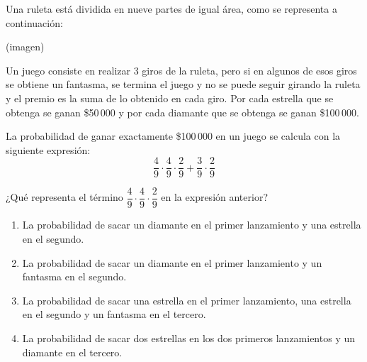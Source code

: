 \begin{problem}
    Una ruleta está dividida en nueve partes de igual área, como se representa a continuación:

    \begin{center}
    (imagen)
    \end{center}

    Un juego consiste en realizar 3 giros de la ruleta, pero si en algunos de esos giros se obtiene un fantasma, se termina el juego y no se puede seguir girando la ruleta y el premio es la suma de lo obtenido en cada giro. Por cada estrella que se obtenga se ganan \$50\,000 y por cada diamante que se obtenga se ganan \$100\,000.

    La probabilidad de ganar exactamente \$100\,000 en un juego se calcula con la siguiente expresión:
    \[
    \frac{4}{9} \cdot \frac{4}{9} \cdot \frac{2}{9} + \frac{3}{9} \cdot \frac{2}{9}
    \]

    ¿Qué representa el término $\dfrac{4}{9} \cdot \dfrac{4}{9} \cdot \dfrac{2}{9}$ en la expresión anterior?

    \begin{enumerate}[label=\Alph*.]
        \item La probabilidad de sacar un diamante en el primer lanzamiento y una estrella en el segundo.
        \item La probabilidad de sacar un diamante en el primer lanzamiento y un fantasma en el segundo.
        \item La probabilidad de sacar una estrella en el primer lanzamiento, una estrella en el segundo y un fantasma en el tercero.
        \item La probabilidad de sacar dos estrellas en los dos primeros lanzamientos y un diamante en el tercero.
    \end{enumerate}
\end{problem}

